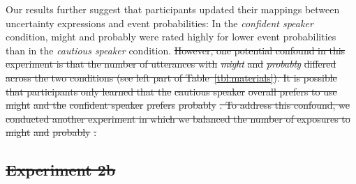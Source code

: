 \documentclass[man, floatsintext]{apa6}
\providecommand{\DIFdel}[1]{{\protect\color{red}\sout{#1}}}                      %
\providecommand{\DIFdelbegin}{} %
\newcommand{\DIFscaledelfig}{0.5}
\newlength{\DIFdelgraphicswidth} %
\newlength{\DIFdelgraphicsheight} %
\newcommand{\DIFdelincludegraphics}[2][]{%
\sbox{\DIFdelgraphicsbox}{\DIFOincludegraphics[#1]{#2}}%
\settoboxwidth{\DIFdelgraphicswidth}{\DIFdelgraphicsbox} %
\settoboxtotalheight{\DIFdelgraphicsheight}{\DIFdelgraphicsbox} %
\scalebox{\DIFscaledelfig}{%
\parbox[b]{\DIFdelgraphicswidth}{\usebox{\DIFdelgraphicsbox}\\[-\baselineskip] \rule{\DIFdelgraphicswidth}{0em}}\llap{\resizebox{\DIFdelgraphicswidth}{\DIFdelgraphicsheight}{%
\setlength{\unitlength}{\DIFdelgraphicswidth}%
\begin{picture}(1,1)%
\thicklines\linethickness{2pt} %
{\color[rgb]{1,0,0}\put(0,0){\framebox(1,1){}}}%
{\color[rgb]{1,0,0}\put(0,0){\line( 1,1){1}}}%
{\color[rgb]{1,0,0}\put(0,1){\line(1,-1){1}}}%
\end{picture}%
}\hspace*{3pt}}} %
} %
\DeclareRobustCommand{\DIFdelbegin}{\DIFOdelbegin \let\includegraphics\DIFdelincludegraphics} %
\begin{document}

Our results further suggest that participants updated their mappings between uncertainty expressions and event probabilities: In the {\it confident speaker} condition, {\sc might} and {\sc probably} were rated highly for lower event probabilities than in the {\it cautious speaker} condition. \DIFdelbegin \DIFdel{However, one potential confound in this experiment is that the number of utterances with }\textit{\DIFdel{might}} %
\DIFdel{and }\textit{\DIFdel{probably}} %
\DIFdel{differed across the two conditions (see left part of Table~\ref{tbl:materials}). It is possible that participants only learned that the }%
\DIFdel{cautious speaker}%
\DIFdel{overall prefers to use }%
\DIFdel{might}%
\DIFdel{and the }%
\DIFdel{confident speaker}%
\DIFdel{prefers }%
\DIFdel{probably}%
\DIFdel{. To address this confound, we conducted another experiment in which we balanced the number of exposures to }%
\DIFdel{might}%
\DIFdel{and }%
\DIFdel{probably}%
\DIFdel{.
}%

\subsection{\DIFdel{Experiment 2b}}
\addtocounter{subsection}{-1}%
\end{document}
